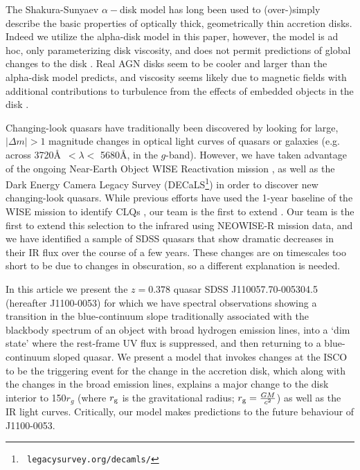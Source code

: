 \documentclass{nature}
\begin{document}
The Shakura-Sunyaev $\alpha-$disk model \cite{SS73} has long been used
to (over-)simply describe the basic properties of optically thick,
geometrically thin accretion disks. Indeed we utilize the alpha-disk
model in this paper, however, the model is ad hoc, only parameterizing
disk viscosity, and does not permit predictions of global changes to
the disk \cite{King2012}. Real AGN disks seem to be cooler \cite[e.g.,
][]{Lawrence2012} and larger \cite[e.g.,][]{Pooley2007, Morgan2010,
Morgan2012, Mosquera2011} than the alpha-disk model predicts, and
viscosity seems likely due to magnetic fields \cite{Balbus_Hawley1991}
with additional contributions to turbulence from the effects of
embedded objects in the disk \cite[e.g., ][]{McKernan2014}.

Changing-look quasars have traditionally been discovered by looking
for large, $| \Delta m | >1$ magnitude changes in optical light curves
of quasars or galaxies (e.g. across 3720\AA\ $< \lambda <$ 5680\AA, in
the $g$-band). However, we have taken advantage of the ongoing
Near-Earth Object WISE Reactivation mission \cite[NEOWISE-R;
][]{Mainzer2014, Meisner2017a, Meisner2017b}, as well as the Dark
Energy Camera Legacy Survey (DECaLS\footnote{{\tt
legacysurvey.org/decamls/}}) in order to discover new changing-look
quasars. While previous efforts have used the 1-year baseline of the
WISE mission to identify CLQs \cite[e.g., []{Assef2017}, our team is
the first to extend .  Our team is the first to extend this selection
to the infrared using NEOWISE-R mission data, and we have identified a
sample of SDSS quasars that show dramatic decreases in their IR flux
over the course of a few years. These changes are on timescales too
short to be due to changes in obscuration, so a different explanation
is needed.

In this article we present the $z=0.378$ quasar SDSS
J110057.70-005304.5 (hereafter J1100-0053) for which we have spectral
observations showing a transition in the blue-continuum slope
traditionally associated with the blackbody spectrum of an object with
broad hydrogen emission lines, into a `dim state' where the rest-frame
UV flux is suppressed, and then returning to a blue-continuum sloped
quasar.  We present a model that invokes changes at the ISCO to be the
triggering event for the change in the accretion disk, which along
with the changes in the broad emission lines, explains a major change
to the disk interior to 150$r_{g}$ (where $r_{\rm g}$ is the
gravitational radius; $r_{\rm g}=\frac{GM}{c^2}$) as well as the IR
light curves. Critically, our model makes predictions to the future
behaviour of J1100-0053.
 
\end{document}
